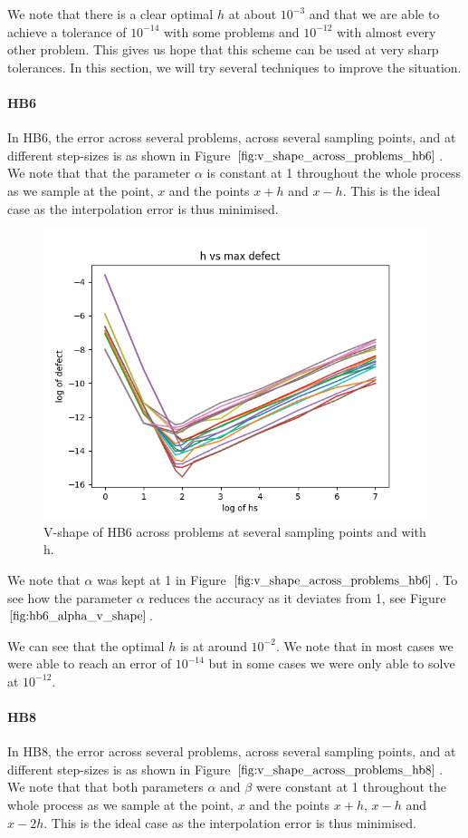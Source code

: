 We note that there is a clear optimal $h$ at about $10^{-3}$ and that we are able to achieve a tolerance of  $10^{-14}$ with some problems and $10^{-12}$ with almost every other problem. This gives us hope that this scheme can be used at very sharp tolerances. In this section, we will try several techniques to improve the situation. 


\paragraph{HB6}
In HB6, the error across several problems, across several sampling points, and at different step-sizes is as shown in Figure $\ref{fig:v_shape_across_problems_hb6}$. We note that that the parameter $\alpha$ is constant at 1 throughout the whole process as we sample at the point, $x$ and the points $x+h$ and $x-h$. This is the ideal case as the interpolation error is thus minimised.

\begin{figure}[H]
\centering
\includegraphics[width=0.7\linewidth]{./figures/v_shape_across_problems_hb6}
\caption{V-shape of HB6 across problems at several sampling points and with h.}
\label{fig:v_shape_across_problems_hb6}
\end{figure}

We note that $\alpha$ was kept at 1 in Figure $\ref{fig:v_shape_across_problems_hb6}$. To see how the parameter $\alpha$ reduces the accuracy as it deviates from 1, see Figure $\ref{fig:hb6_alpha_v_shape}$.

We can see that the optimal $h$ is at around $10^{-2}$. We note that in most cases we were able to reach an error of $10^{-14}$ but in some cases we were only able to solve at $10^{-12}$. 


\paragraph{HB8}
In HB8, the error across several problems, across several sampling points, and at different step-sizes is as shown in Figure $\ref{fig:v_shape_across_problems_hb8}$. We note that that both parameters $\alpha$ and $\beta$ were constant at 1 throughout the whole process as we sample at the point, $x$ and the points $x+h$, $x-h$ and $x-2h$. This is the ideal case as the interpolation error is thus minimised. 

